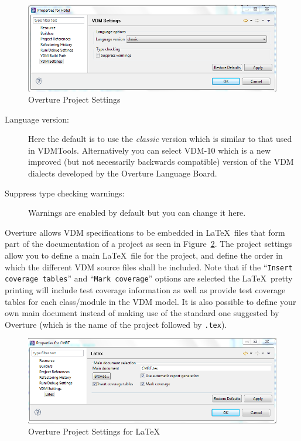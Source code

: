 \documentclass{overturerepchap}
\begin{document}
\begin{figure}[!hbt]
\begin{center}
  \includegraphics[width=\textwidth]{screendumps/projectsettings}
  \caption[Overture Project Settings]{Overture Project Settings}
  \label{fig:VDMSettings}
\end{center}
\end{figure}

\begin{description}
\item[Language version:] Here the default is to use the
  \emph{classic} version which is similar to that used in
  VDMTools. Alternatively you can select VDM-10 which
  is a new improved (but not necessarily backwards compatible) version of
  the VDM dialects developed by the Overture Language Board. 
\item[Suppress type checking warnings:] Warnings are enabled
  by default but you can change it here.
\end{description}

Overture allows VDM specifications to be embedded in \LaTeX\ files that
form part of the documentation of a project as seen in
Figure~\ref{fig:VDMSettingsLatex}. The project settings allow you
to define a main \LaTeX\ file for the project, and define the order in which the
different VDM source files shall be included. Note that if the
``\texttt{Insert coverage tables}'' and ``\texttt{Mark coverage}''
options are selected the \LaTeX\ pretty printing will include test
coverage information as well as provide test coverage tables for each
class/module in the VDM model. It is also possible to define your own
main document instead of making use of the standard one suggested by
Overture (which is the name of the project followed by \texttt{.tex}).

\begin{figure}[!hbt]
\begin{center}
  \includegraphics[width=\textwidth]{screendumps/projectsettingslatex}
  \caption[Overture Project Settings]{Overture Project Settings for \LaTeX}
  \label{fig:VDMSettingsLatex}
\end{center}
\end{figure}
\end{document}
